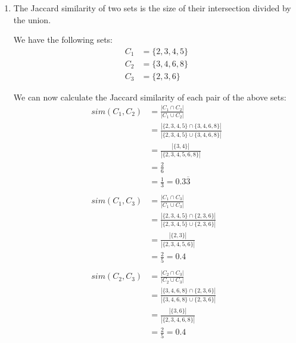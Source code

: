 \documentclass{article}
\begin{document}
    \begin{enumerate}[label=\alph*., left=10pt, itemsep=10pt]

        \item \begin{minipage}[t]{0.9\textwidth}
            The Jaccard similarity of two sets is the size of their intersection divided by the union.
            
            We have the following sets:
            \begin{align*}
                C_{1} &= \{2,3,4,5\}\\
                C_{2} &= \{3,4,6,8\}\\
                C_{3} &= \{2,3,6\}
            \end{align*}
            
            We can now calculate the Jaccard similarity of each pair of the above sets:
            \begin{align*}
                sim(C_{1},C_{2}) &= \frac{|C_{1} \cap C_{2}|}{|C_{1} \cup C_{2}|}\\
                                 &= \frac{|\{2,3,4,5\} \cap \{3,4,6,8\}|}{|\{2,3,4,5\} \cup \{3,4,6,8\}|}\\
                                 &= \frac{|\{3,4\}|}{|\{2,3,4,5,6,8\}|}\\
                                 &= \frac{2}{6}\\
                                 &= \frac{1}{3} = 0.3\overline{3}\\
                \\
                sim(C_{1},C_{3}) &= \frac{|C_{1} \cap C_{3}|}{|C_{1} \cup C_{3}|}\\
                                 &= \frac{|\{2,3,4,5\} \cap \{2,3,6\}|}{|\{2,3,4,5\} \cup \{2,3,6\}|}\\
                                 &= \frac{|\{2,3\}|}{|\{2,3,4,5,6\}|}\\
                                 &= \frac{2}{5} = 0.4\\
                \\
                sim(C_{2},C_{3}) &= \frac{|C_{2} \cap C_{3}|}{|C_{2} \cup C_{3}|}\\
                                 &= \frac{|\{3,4,6,8\} \cap \{2,3,6\}|}{|\{3,4,6,8\} \cup \{2,3,6\}|}\\
                                 &= \frac{|\{3,6\}|}{|\{2,3,4,6,8\}|}\\
                                 &= \frac{2}{5} = 0.4\\
            \end{align*}
        \end{minipage}

    \end{enumerate}
\end{document}
